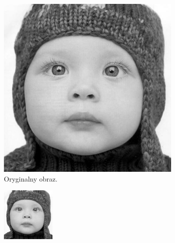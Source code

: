 \documentclass[a4paper,11pt, notitlepage ]{article}
\begin{document}
	 \begin{figure}[h!]
	 	\centering
	 	\begin{subfigure}[b]{0.4\linewidth}
	 		\includegraphics[width=\linewidth]{SRCNN/Input.jpg}
	 		\caption{Oryginalny obraz.}
	 	\end{subfigure}
	 	\begin{subfigure}[b]{0.4\linewidth}
	 		\includegraphics[width=\linewidth]{SRCNN/test_srcnn.png}

\end{subfigure}
\end{figure}
\end{document}
